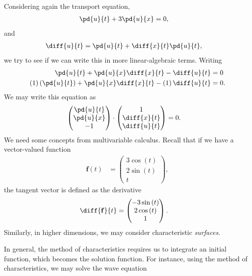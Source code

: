 \documentclass[10pt]{mypackage}
\begin{document}
\begin{example}
  Considering again the transport equation,
  \begin{align*}
    \pd{u}{t} + 3 \pd{u}{x} &= 0,
  \end{align*}
  and
  \begin{align*}
    \diff{u}{t} &= \pd{u}{t} + \diff{x}{t} \pd{u}{t},
  \end{align*}
  we try to see if we can write this in more linear-algebraic terms. Writing
  \begin{align*}
    \pd{u}{t} + \pd{u}{x}\diff{x}{t} - \diff{u}{t} &= 0\\
    \left( 1 \right) \left( \pd{u}{t} \right) + \pd{u}{x}\diff{x}{t} - \left( 1 \right) \diff{u}{t} &= 0.
  \end{align*}
  We may write this equation as
  \begin{align*}
    \begin{pmatrix}\pd{u}{t}\\ \pd{u}{x} \\ -1 \end{pmatrix} \cdot \begin{pmatrix}1\\ \diff{x}{t} \\ \diff{u}{t}\end{pmatrix} &= 0.
  \end{align*}
  We need some concepts from multivariable calculus. Recall that if we have a vector-valued function
  \begin{align*}
    \mathbf{f}\left( t \right) &= \begin{pmatrix}3\cos\left( t \right)\\ 2\sin\left( t \right)\\t\end{pmatrix},
  \end{align*}
  the tangent vector is defined as the derivative
  \begin{align*}
    \diff{\mathbf{f}}{t} &= \begin{pmatrix}-3\sin\left( t \right)\\2\cos\left( t \right)\\1\end{pmatrix}.
  \end{align*}
  Similarly, in higher dimensions, we may consider characteristic \textit{surfaces}.
\end{example}
In general, the method of characteristics requires us to integrate an initial function, which becomes the solution function. For instance, using the method of characteristics, we may solve the wave equation
\end{document}
